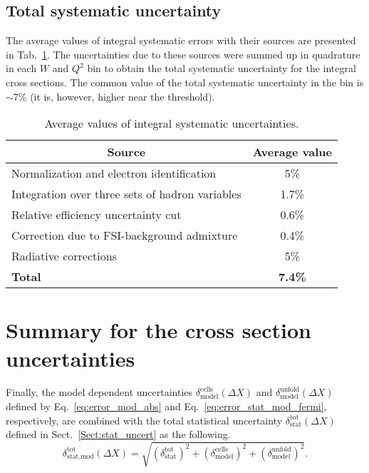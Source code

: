 \subsection{Total systematic uncertainty}

The average values of integral systematic errors with their sources are presented in Tab.~\ref{tab:sys_err}. The uncertainties due to these sources were summed up in quadrature in each $W$ and $Q^{2}$ bin to obtain the total systematic uncertainty for the integral cross sections. The common value of the total systematic uncertainty in the bin is $\sim$7\% (it is, however, higher near the threshold).

\begin{table}[htp]\normalsize
\begin{center}
\caption{\small Average values of integral systematic uncertainties. \label{tab:sys_err}}
\begin{tabular}{|l|c|}

\hline
\multicolumn{1}{|c|}{Source} & Average value \\ \hline
Normalization and electron identification & 5\% \\ \hline
Integration over three sets of hadron variables & 1.7\%\\ \hline 
Relative efficiency uncertainty cut & 0.6\%\\ \hline 
Correction due to FSI-background admixture & 0.4\%\\ \hline 
Radiative corrections & 5\% \\ \hline 
\bf{Total} & \bf{7.4}\% \\ \hline 
\end{tabular}
\end{center}
\end{table} 



\section{Summary for the cross section uncertainties}
\label{Sect:uncert_resume}


Finally, the model dependent uncertainties $\delta^{\text{cells}}_{\text{model}}(\Delta X)$ and $\delta^{\text{unfold}}_{\text{model}}(\Delta X)$ defined by Eq.~\eqref{eq:error_mod_abs} and Eq.~\eqref{eq:error_stat_mod_fermi}, respectively, are combined with the total statistical uncertainty $\delta_{\text{stat}}^{\text{tot}}(\Delta X)$ defined in Sect.~\ref{Sect:stat_uncert} as the following.
\begin{equation}
\delta_{\text{stat,mod}}^{\text{tot}} (\Delta X) =
\sqrt{\left (\delta_{\text{stat}}^{\text{tot}} \right )^{2} + \left (\delta^{\text{cells}}_{\text{model}}\right )^{2} + \left (\delta^{\text{unfold}}_{\text{model}}\right )^{2}}.
\label{eq:error_stat_mod}
\end{equation}


